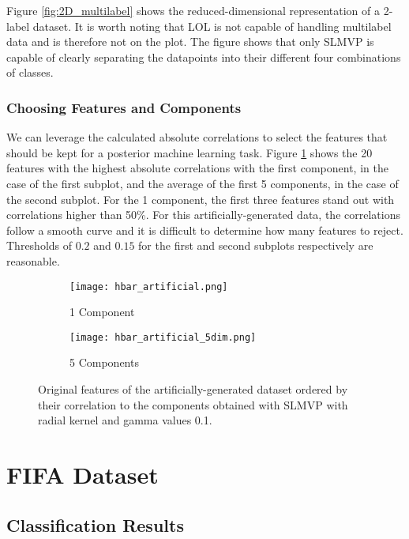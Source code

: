Figure \ref{fig:2D_multilabel} shows the reduced-dimensional representation of a 2-label dataset. It is worth noting that LOL is not capable of handling multilabel data and is therefore not on the plot. The figure shows that only SLMVP is capable of clearly separating the datapoints into their different four combinations of classes.

\subsubsection{Choosing Features and Components}

We can leverage the calculated absolute correlations to select the features that should be kept for a posterior machine learning task. Figure \ref{fig:hbar-artificial} shows the 20 features with the highest absolute correlations with the first component, in the case of the first subplot, and the average of the first 5 components, in the case of the second subplot. For the 1 component, the first three features stand out with correlations higher than 50\%. For this artificially-generated data, the correlations follow a smooth curve and it is difficult to determine how many features to reject. Thresholds of $0.2$ and $0.15$ for the first and second subplots respectively are reasonable.

\begin{figure}[!ht]
    \centering
    \begin{subfigure}{.5\textwidth}
        \centering
        \texttt{[image: hbar\_artificial.png]}
        \caption{1 Component}
    \end{subfigure}%
    \begin{subfigure}{.5\textwidth}
        \centering
        \texttt{[image: hbar\_artificial\_5dim.png]}
        \caption{5 Components}
    \end{subfigure}
    \caption{Original features of the artificially-generated dataset ordered by their correlation to the components obtained with SLMVP with radial kernel and gamma values 0.1.}
    \label{fig:hbar-artificial}
\end{figure}


\section{FIFA Dataset}\label{section:fifa}

\subsection{Classification Results}

